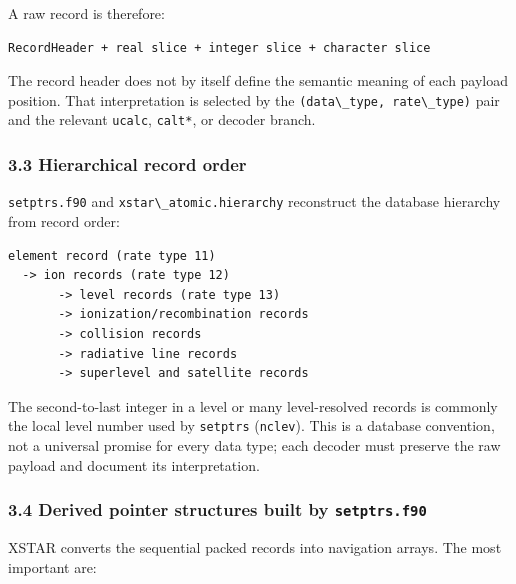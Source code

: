 \documentclass[
  10pt,
]{article}
\newcommand{\passthrough}[1]{#1}
\begin{document}
A raw record is therefore:

\begin{lstlisting}
RecordHeader + real slice + integer slice + character slice
\end{lstlisting}

The record header does not by itself define the semantic meaning of each
payload position. That interpretation is selected by the
\passthrough{\lstinline!(data\_type, rate\_type)!} pair and the relevant
\passthrough{\lstinline!ucalc!}, \passthrough{\lstinline!calt*!}, or
decoder branch.

\subsubsection{3.3 Hierarchical record
order}\label{hierarchical-record-order}

\passthrough{\lstinline!setptrs.f90!} and
\passthrough{\lstinline!xstar\_atomic.hierarchy!} reconstruct the
database hierarchy from record order:

\begin{lstlisting}
element record (rate type 11)
  -> ion records (rate type 12)
       -> level records (rate type 13)
       -> ionization/recombination records
       -> collision records
       -> radiative line records
       -> superlevel and satellite records
\end{lstlisting}

The second-to-last integer in a level or many level-resolved records is
commonly the local level number used by
\passthrough{\lstinline!setptrs!} (\passthrough{\lstinline!nclev!}).
This is a database convention, not a universal promise for every data
type; each decoder must preserve the raw payload and document its
interpretation.

\subsubsection{\texorpdfstring{3.4 Derived pointer structures built by
\texttt{setptrs.f90}}{3.4 Derived pointer structures built by setptrs.f90}}\label{derived-pointer-structures-built-by-setptrs.f90}

XSTAR converts the sequential packed records into navigation arrays. The
most important are:
\end{document}
